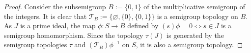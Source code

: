 \documentclass[11pt]{amsart}
\newtheorem{lemma}[theorem]{Lemma}
\theoremstyle{definition}
\newcommand{\N}{\mathbb N}
\newcommand{\w}{\omega}
\newcommand{\Tau}{\mathcal T}
\begin{document}
\begin{proof}
Consider the subsemigroup \(B:=\{0, 1\}\) of the multiplicative semigroup of the integers. It is clear that \(\Tau_B:=\{\varnothing, \{0\}, \{0,1\}\}\) is a semigroup topology on $B$. 
As \(J\) is a prime ideal, the map \(\phi:S\to B\) defined by \((s)\phi=0\iff s\in J\) is a semigroup homomorphism.
Since the topology \(\tau(J)\) is generated by the semigroup topologies \(\tau\) and \((\Tau_B)\phi^{-1}\) on \(S\), it is also a semigroup topology.
\end{proof}




\end{document}
